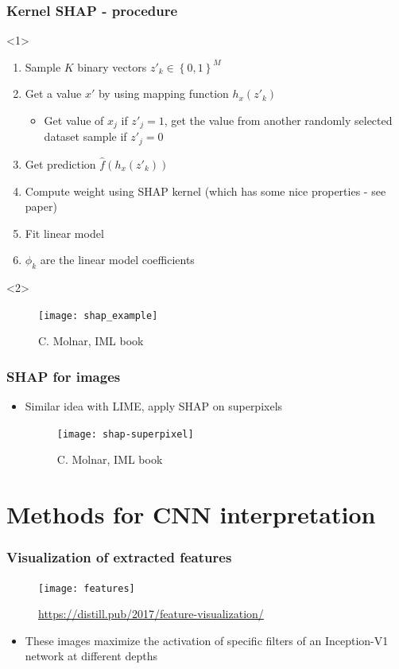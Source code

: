 \begin{frame}
  \frametitle{Kernel SHAP - procedure}
  \begin{onlyenv}<1>
  \begin{enumerate}
  \item Sample $K$ binary vectors $z'_k \in \left\{0, 1\right\}^M$
  \item Get a value $x'$ by using mapping function $h_x(z'_k)$
    \begin{itemize}
      \item Get value of $x_j$ if $z'_j = 1$, get the value from another
        randomly selected dataset sample if $z'_j = 0$
    \end{itemize}
  \item Get prediction $\hat{f}(h_x(z'_k))$
  \item Compute weight using SHAP kernel (which has some nice properties - see paper)
  \item Fit linear model
  \item $\phi_k$ are the linear model coefficients
  \end{enumerate}
  \end{onlyenv}
  \begin{onlyenv}<2>
      \begin{figure}
    \texttt{[image: shap\_example]}
    \caption{\footnotesize C. Molnar, IML book}
  \end{figure}
  \end{onlyenv}
\end{frame}

\begin{frame}
    \frametitle{SHAP for images}
  \begin{itemize}
  \item Similar idea with LIME, apply SHAP on superpixels
    \begin{figure}
      \texttt{[image: shap-superpixel]}
      \caption{\footnotesize C. Molnar, IML book}
    \end{figure}
  \end{itemize}
\end{frame}

\section{Methods for CNN interpretation}

\begin{frame}
  \frametitle{Visualization of extracted features}
  \begin{figure}
    \texttt{[image: features]}
    \caption{\footnotesize \url{https://distill.pub/2017/feature-visualization/}}
  \end{figure}
  \begin{itemize}
  \item These images maximize the activation of specific filters of an
    Inception-V1 network at different depths
  \end{itemize}
\end{frame}

